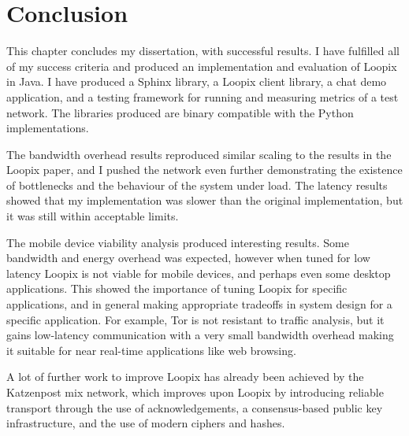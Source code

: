 \documentclass[final,dissertation.tex]{subfiles}
\begin{document}
\chapter{Conclusion}

This chapter concludes my dissertation, with successful results. I have fulfilled all of my success criteria and produced an implementation and evaluation of Loopix in Java. I have produced a Sphinx library, a Loopix client library, a chat demo application, and a testing framework for running and measuring metrics of a test network. The libraries produced are binary compatible with the Python implementations.

The bandwidth overhead results reproduced similar scaling to the results in the Loopix paper, and I pushed the network even further demonstrating the existence of bottlenecks and the behaviour of the system under load. The latency results showed that my implementation was slower than the original implementation, but it was still within acceptable limits.

The mobile device viability analysis produced interesting results. Some bandwidth and energy overhead was expected, however when tuned for low latency Loopix is not viable for mobile devices, and perhaps even some desktop applications. This showed the importance of tuning Loopix for specific applications, and in general making appropriate tradeoffs in system design for a specific application. For example, Tor is not resistant to traffic analysis, but it gains low-latency communication with a very small bandwidth overhead making it suitable for near real-time applications like web browsing.

A lot of further work to improve Loopix has already been achieved by the Katzenpost mix network, which improves upon Loopix by introducing reliable transport through the use of acknowledgements, a consensus-based public key infrastructure, and the use of modern ciphers and hashes.
\end{document}
